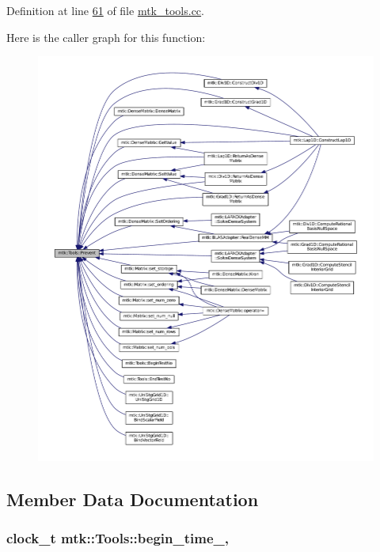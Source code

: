 Definition at line \hyperlink{mtk__tools_8cc_source_l00061}{61} of file \hyperlink{mtk__tools_8cc_source}{mtk\-\_\-tools.\-cc}.



Here is the caller graph for this function\-:
\nopagebreak
\begin{figure}[H]
\begin{center}
\leavevmode
\includegraphics[width=350pt]{classmtk_1_1Tools_acbcff02946d3db565d53ecbcc459f0b5_icgraph}
\end{center}
\end{figure}




\subsection{Member Data Documentation}
\hypertarget{classmtk_1_1Tools_a4bd58d08397db42271ed9e2d3ecc9963}{
\subsubsection[{begin\-\_\-time\-\_\-}]{\setlength{\rightskip}{0pt plus 5cm}clock\-\_\-t mtk\-::\-Tools\-::begin\-\_\-time\-\_\-\hspace{0.3cm}{\ttfamily [static]}, {\ttfamily [private]}}}\label{classmtk_1_1Tools_a4bd58d08397db42271ed9e2d3ecc9963}


